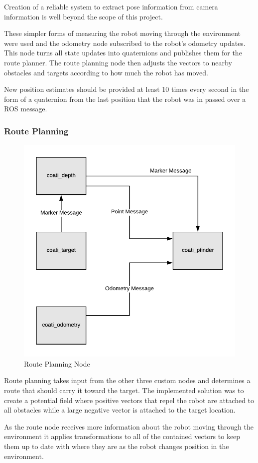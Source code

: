 \documentclass{article}[12]
\begin{document}
	Creation of a reliable system to extract pose information from camera information is well beyond the scope of this project.
	
	These simpler forms of measuring the robot moving through the environment were used and the odometry node subscribed to the robot's odometry updates. This node turns all state updates into quaternions and publishes them for the route planner. The route planning node then adjusts the vectors to nearby obstacles and targets according to how much the robot has moved. 
	
	New position estimates should be provided at least 10 times every second in the form of a quaternion from the last position that the robot was in passed over a ROS message.
	

	\subsubsection{Route Planning}
	
	\begin{figure}[H]
		\centering
		\includegraphics[width=0.6\linewidth]{PathFinderDiagram.png}
		\caption{Route Planning Node}
		\label{fig:routeplanning}
	\end{figure}

	Route planning takes input from the other three custom nodes and determines a route that should carry it toward the target. The implemented solution was to create a potential field where positive vectors that repel the robot are attached to all obstacles while a large negative vector is attached to the target location.
	
	As the route node receives more information about the robot moving through the environment it applies transformations to all of the contained vectors to keep them up to date with where they are as the robot changes position in the environment. 
	
\end{document}

